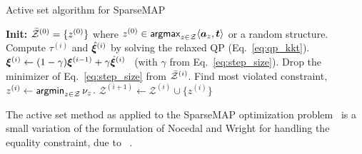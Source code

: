 \begin{algorithm}[htpb]
    \caption{Active set algorithm for SparseMAP \label{alg:activeset}}
    \begin{algorithmic}[1]
        \Statex \textbf{Init:}
        $\bar{\mathcal{Z}}^{(0)} = \{ z^{(0)}\}$
        \quad where \quad
        $z^{(0)} \in \operatorname*{\mathsf{argmax}}_{z \in \mathcal{Z}} \langle\bm{a}_z,\bm{t}\rangle$
        or a random structure.
        \State Compute $\tau^{(i)}$ and $\hat{\bm{\xi}}^{(i)}$ by solving the relaxed QP (Eq.~\ref{eq:qp_kkt}).
        \State $\bm{\xi}^{(i)} \gets (1-\gamma) \bm{\xi}^{(i-1)} + \gamma \hat{\bm{\xi}}^{(i)}$
        ~(with $\gamma$ from Eq.~\ref{eq:step_size}).
        \State Drop the minimizer of Eq.~\ref{eq:step_size} from $\bar{\mathcal{Z}}^{(i)}$.
        \Else
        \State Find most violated constraint,
        $z^{(i)} \gets \operatorname*{\mathsf{argmin}}_{z \in \mathcal{Z}} \nu_z$.
        \State \Return {}
        \Else
        \State $\mathcal{Z}^{(i+1)} \gets \mathcal{Z}^{(i)} \cup \{ z^{(i)} \}$
        \EndIf
        \EndIf
        \EndFor
    \end{algorithmic}
\end{algorithm}

The active set method
\citep[Chapters 16.4 \& 16.5]{nocedalwright} as applied to the SparseMAP
optimization problem~\citep[;][]{sparsemap}
is a small variation of the formulation of Nocedal and Wright for handling
the equality constraint, due to ~\citet[Section 6]{ad3}.

